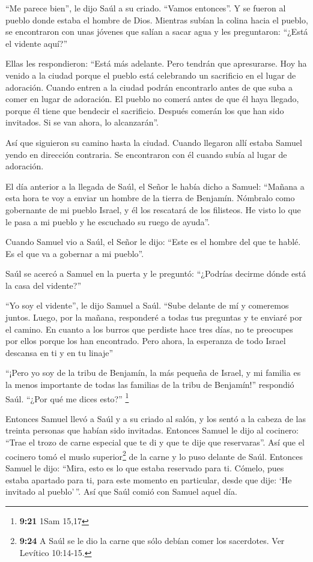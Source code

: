  ``Me parece bien'', le dijo Saúl a su criado. ``Vamos
entonces''. Y se fueron al pueblo donde estaba el hombre de Dios.
 Mientras subían la colina hacia el pueblo, se
encontraron con unas jóvenes que salían a sacar agua y les preguntaron:
``¿Está el vidente aquí?''

 Ellas les respondieron: ``Está más adelante. Pero
tendrán que apresurarse. Hoy ha venido a la ciudad porque el pueblo está
celebrando un sacrificio en el lugar de adoración. 
Cuando entren a la ciudad podrán encontrarlo antes de que suba a comer
en lugar de adoración. El pueblo no comerá antes de que él haya llegado,
porque él tiene que bendecir el sacrificio. Después comerán los que han
sido invitados. Si se van ahora, lo alcanzarán''.

 Así que siguieron su camino hasta la ciudad. Cuando
llegaron allí estaba Samuel yendo en dirección contraria. Se encontraron
con él cuando subía al lugar de adoración.

 El día anterior a la llegada de Saúl, el Señor le había
dicho a Samuel:  ``Mañana a esta hora te voy a enviar un
hombre de la tierra de Benjamín. Nómbralo como gobernante de mi pueblo
Israel, y él los rescatará de los filisteos. He visto lo que le pasa a
mi pueblo y he escuchado su ruego de ayuda''.

 Cuando Samuel vio a Saúl, el Señor le dijo: ``Este es el
hombre del que te hablé. Es el que va a gobernar a mi pueblo''.

 Saúl se acercó a Samuel en la puerta y le preguntó:
``¿Podrías decirme dónde está la casa del vidente?''

 ``Yo soy el vidente'', le dijo Samuel a Saúl. ``Sube
delante de mí y comeremos juntos. Luego, por la mañana, responderé a
todas tus preguntas y te enviaré por el camino.  En
cuanto a los burros que perdiste hace tres días, no te preocupes por
ellos porque los han encontrado. Pero ahora, la esperanza de todo Israel
descansa en ti y en tu linaje''

 ``¡Pero yo soy de la tribu de Benjamín, la más pequeña
de Israel, y mi familia es la menos importante de todas las familias de
la tribu de Benjamín!'' respondió Saúl. ``¿Por qué me dices esto?''
\footnote{\textbf{9:21} 1Sam 15,17}

 Entonces Samuel llevó a Saúl y a su criado al salón, y
los sentó a la cabeza de las treinta personas que habían sido invitadas.
 Entonces Samuel le dijo al cocinero: ``Trae el trozo de
carne especial que te di y que te dije que reservaras''. 
Así que el cocinero tomó el muslo superior\footnote{\textbf{9:24} A Saúl
  se le dio la carne que sólo debían comer los sacerdotes. Ver Levítico
  10:14-15.} de la carne y lo puso delante de Saúl. Entonces Samuel le
dijo: ``Mira, esto es lo que estaba reservado para ti. Cómelo, pues
estaba apartado para ti, para este momento en particular, desde que
dije: `He invitado al pueblo'\,''. Así que Saúl comió con Samuel aquel
día.

